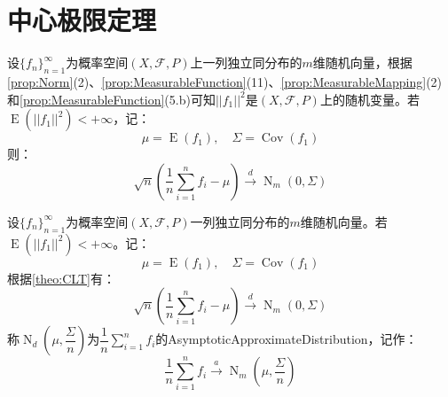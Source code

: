 \section{中心极限定理}

\begin{theorem}\label{theo:CLT}
	设$\{f_n\}_{n=1}^{\infty}$为概率空间$(X,\mathscr{F},P)$上一列独立同分布的$m$维随机向量，根据\cref{prop:Norm}(2)、\cref{prop:MeasurableFunction}(11)、\cref{prop:MeasurableMapping}(2)和\cref{prop:MeasurableFunction}(5.b)可知$||f_1||^2$是$(X,\mathscr{F},P)$上的随机变量。若$\operatorname{E}(||f_1||^2)<+\infty$，记：
	\begin{equation*}
		\mu=\operatorname{E}(f_1),\quad\Sigma=\operatorname{Cov}(f_1)
	\end{equation*}
	则：
	\begin{equation*}
		\sqrt{n}\left(\frac{1}{n}\sum_{i=1}^{n}f_i-\mu\right)\overset{d}{\longrightarrow}\operatorname{N}_m(0,\Sigma)
	\end{equation*}
\end{theorem}
\begin{definition}
	设$\{f_n\}_{n=1}^{\infty}$为概率空间$(X,\mathscr{F},P)$一列独立同分布的$m$维随机向量。若$\operatorname{E}(||f_1||^2)<+\infty$。记：
	\begin{equation*}
		\mu=\operatorname{E}(f_1),\quad\Sigma=\operatorname{Cov}(f_1)
	\end{equation*}
	根据\cref{theo:CLT}有：
	\begin{equation*}
		\sqrt{n}\left(\frac{1}{n}\sum_{i=1}^{n}f_i-\mu\right)\overset{d}{\longrightarrow}\operatorname{N}_m(0,\Sigma)
	\end{equation*}
	称$\operatorname{N}_d\left(\mu,\dfrac{\Sigma}{n}\right)$为$\dfrac{1}{n}\sum\limits_{i=1}^{n}f_i$的\gls{AsymptoticApproximateDistribution}，记作：
	\begin{equation*}
		\frac{1}{n}\sum_{i=1}^{n}f_i\overset{a}{\longrightarrow}\operatorname{N}_m\left(\mu,\frac{\Sigma}{n}\right)
	\end{equation*}
\end{definition}